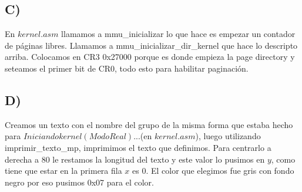 \subsection*{C)}
En $kernel.asm$ llamamos a mmu\_inicializar lo que hace es empezar un contador de páginas libres. Llamamos a mmu\_inicializar\_dir\_kernel que hace lo descripto arriba. \newline
Colocamos en CR3 0x27000 porque es donde empieza la page directory y seteamos el primer bit de CR0, todo esto para habilitar paginación. 


\subsection*{D)}
Creamos un texto con el nombre del grupo de la misma forma que estaba hecho para \newline$Iniciando kernel (Modo Real)...$(en $kernel.asm$), luego utilizando imprimir\_texto\_mp, 
imprimimos el texto que definimos. Para centrarlo a derecha a 80 le restamos la longitud del texto y este valor lo pusimos en $y$, 
como tiene que estar en la primera fila $x$ es 0. El color que elegimos fue gris con fondo negro por eso pusimos 0x07 para el color.
